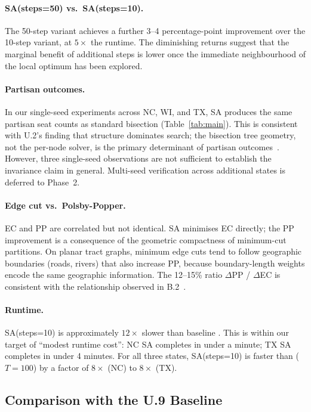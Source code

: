 \paragraph{SA(steps=50) vs.\ SA(steps=10).}
The 50-step variant achieves a further 3--4 percentage-point improvement
over the 10-step variant, at $5\times$ the runtime.
The diminishing returns suggest that the marginal benefit of additional
steps is lower once the immediate neighbourhood of the \metis{} local
optimum has been explored.

\paragraph{Partisan outcomes.}
In our single-seed experiments across NC, WI, and TX, SA produces the same
partisan seat counts as standard \metis{} bisection (Table~\ref{tab:main}).
This is consistent with U.2's finding that structure dominates search; the
bisection tree geometry, not the per-node solver, is the primary determinant
of partisan outcomes~\citep{b8paper}.
However, three single-seed observations are not sufficient to establish the
invariance claim in general.
Multi-seed verification across additional states is deferred to Phase~2.

\paragraph{Edge cut vs.\ Polsby-Popper.}
EC and PP are correlated but not identical.
SA minimises EC directly; the PP improvement is a consequence of the
geometric compactness of minimum-cut partitions.
On planar tract graphs, minimum edge cuts tend to follow geographic
boundaries (roads, rivers) that also increase PP, because boundary-length
weights encode the same geographic information.
The 12--15\% ratio $\Delta$PP / $\Delta$EC is consistent with the
relationship observed in B.2~\citep{b2paper}.

\paragraph{Runtime.}
SA(steps=10) is approximately $12\times$ slower than baseline \metis{}.
This is within our target of ``modest runtime cost'':
NC SA completes in under a minute; TX SA completes in under 4 minutes.
For all three states, SA(steps=10) is faster than \be{}($T=100$) by a
factor of $8\times$ (NC) to $8\times$ (TX).

\subsection{Comparison with the U.9 Baseline}


